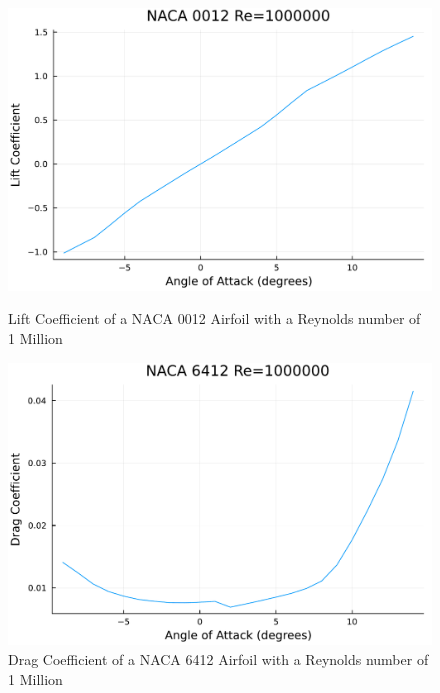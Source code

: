 \documentclass{article}
\begin{document}
\begin{figure}[h]
    \centering
\begin{minipage}[b]{0.32\textwidth}
\centering
\includegraphics[width=\textwidth]{NACA 0012 Re=1000000_Lift_Coefficent_Plot.pdf}
\caption{\label{fig:NACA 0012 Lift}Lift Coefficient of a NACA 0012 Airfoil with a Reynolds number of 1 Million}
\end{minipage}
\begin{minipage}[b]{0.32\textwidth}
\centering
\includegraphics[width=\textwidth]{NACA 6412 Re=1000000_Drag_Coefficent_Plot.pdf}
\caption{\label{fig:NACA 6412 Drag}Drag Coefficient of a NACA 6412 Airfoil with a Reynolds number of 1 Million}
\end{minipage}
\begin{minipage}[b]{0.32\textwidth}
\centering

\end{minipage}
\end{figure}
\end{document}
